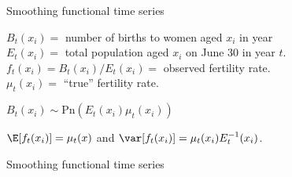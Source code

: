 \documentclass[14pt]{beamer}
\begin{document}
\begin{frame}{\large Smoothing functional time series}\vspace*{-0.2cm}




$B_t(x_i)=$ number of births to women aged $x_i$ in year \\
$E_t(x_i)=$ total population aged $x_i$ on June 30 in year $t$.\\
$f_t(x_i) = B_t(x_i)/E_t(x_i)=$ observed fertility rate.\\
$\mu_t(x_i)=$ ``true'' fertility rate.\pause
\begin{block}{}
\centerline{$B_t(x_i) \sim \mbox{Pn}(E_t(x_i) \mu_t(x_i))$}
\end{block}
\pause 
$\E[f_t(x_i)] = \mu_t(x)$ and $\var[f_t(x_i)] = \mu_t(x_i)E_t^{-1}(x_i)$.

\vspace*{10cm}
\end{frame}


\begin{frame}{\large Smoothing functional time series}



\end{frame}
\end{document}

